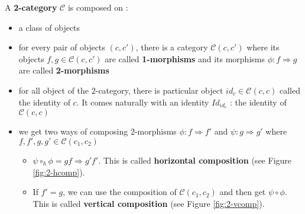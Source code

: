 \begin{defn}[2-category]
    A \textbf{2-category} $\mathcal{C}$ is composed on :
    \begin{itemize}
        \item a class of objects
        \item for every pair of objects $(c,c')$, there is a category $\mathcal{C}(c,c')$ where its objects $f,g\in \mathcal{C}(c,c')$ are called \textbf{1-morphisms} and its morphisms $\phi : f\Rightarrow g$ are called \textbf{2-morphisms}
        \item for all object of the 2-category, there is particular object $id_c\in \mathcal{C}(c,c)$ called the identity of $c$. It comes naturally with an identity $Id_{id_c}$ : the identity of  $\mathcal{C}(c,c)$
        \item we get two ways of composing 2-morphisms $\phi : f\Rightarrow f'$
              and $\psi : g\Rightarrow g'$ where $f,f',g,g' \in \mathcal{C}(c_1,c_2)$
              \begin{itemize}
                  \item $\psi\circ_h\phi = gf\Rightarrow g'f'$. This is called \textbf{horizontal composition}  (see Figure \ref{fig:2-hcomp}).
                  \item If $f' = g$, we can use the composition of $\mathcal{C}(c_1,c_2)$ and then get $\psi\circ\phi$. This is called \textbf{vertical composition} (see Figure \ref{fig:2-vcomp}).
              \end{itemize}


\end{itemize}
\end{defn}
